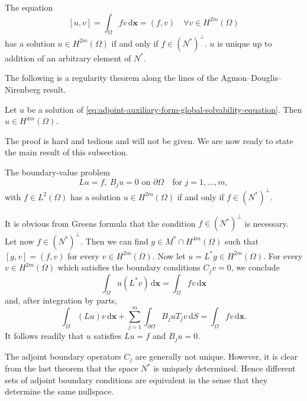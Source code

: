 \begin{Lemma}
\label{lem:adjoint-auxiliary-form-global-solvability}
The equation
\begin{equation}\label{eq:adjoint-auxiliary-form-global-solvability-equation}
[u,v]=\int_\Omega fv\,\mathrm{d}\bm{x}=(f,v)\quad\forall v\in H^{2m}(\Omega)
\end{equation}
has a solution $u\in H^{2m}(\Omega)$ if and only if $f\in(N^*)^\perp$. $u$ is unique up to addition of an arbitrary element of $N^*$.
\end{Lemma}

The following is a regularity theorem along the lines of the Agmon--Douglis--Nirenberg result.

\begin{Theorem}
\label{thm:adjoint-auxiliary-solution-higher-regularity}
Let $u$ be a solution of \eqref{eq:adjoint-auxiliary-form-global-solvability-equation}. Then $u\in H^{4m}(\Omega)$.
\end{Theorem}

The proof is hard and tedious and will not be given. We are now ready to state the main result of this subsection.

\begin{Theorem}
\label{thm:elliptic-adjoint-orthogonality-solvability}
The boundary-value problem
\begin{equation}\label{eq:elliptic-homogeneous-boundary-fredholm-solvability}
Lu=f,\ B_ju=0\text{ on }\partial\Omega\quad\text{for }j=1,\ldots,m,
\end{equation}
with $f\in L^2(\Omega)$ has a solution $u\in H^{2m}(\Omega)$ if and only if $f\in(N^*)^\perp$.
\end{Theorem}

\begin{Proof}
It is obvious from Green\textquotesingle s formula that the condition $f\in(N^*)^\perp$ is necessary. Let now $f\in(N^*)^\perp$. Then we can find $g\in M^*\cap H^{4m}(\Omega)$ such that $[g,v]=(f,v)$ for every $v\in H^{2m}(\Omega)$. Now let $u=L^*g\in H^{2m}(\Omega)$. For every $v\in H^{2m}(\Omega)$ which satisfies the boundary conditions $C_jv=0$, we conclude
\begin{equation}\label{eq:adjoint-solvability-proof-weak-interior-identity}
\int_\Omega u(L^*v)\,\mathrm{d}\bm{x}=\int_\Omega fv\,\mathrm{d}\bm{x}
\end{equation}
and, after integration by parts,
\begin{equation}\label{eq:adjoint-solvability-proof-recovered-boundary-identity}
\int_\Omega(Lu)v\,\mathrm{d}\bm{x}+\sum_{j=1}^m\int_{\partial\Omega}B_juT_jv\,\mathrm{d}S=\int_\Omega fv\,\mathrm{d}\bm{x}.
\end{equation}
It follows readily that $u$ satisfies $Lu=f$ and $B_ju=0$.
\end{Proof}

\begin{Remark}
\label{rem:adjoint-boundary-nullspace-uniqueness}
The adjoint boundary operators $C_j$ are generally not unique. However, it is clear from the last theorem that the space $N^*$ is uniquely determined. Hence different sets of adjoint boundary conditions are equivalent in the sense that they determine the same nullspace.
\end{Remark}
